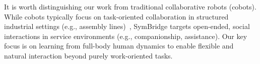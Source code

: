 It is worth distinguishing our work from traditional collaborative robots (cobots). While cobots typically focus on task-oriented collaboration in structured industrial settings (e.g., assembly lines)~\cite{colgate1996cobots,el2019cobot,hentout2019human}, SymBridge targets open-ended, social interactions in service environments (e.g., companionship, assistance). Our key focus is on learning from full-body human dynamics to enable flexible and natural interaction beyond purely work-oriented tasks.

